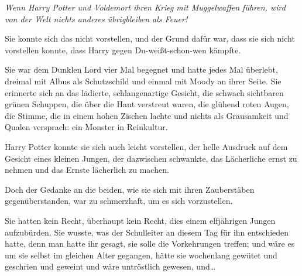 \emph{Wenn Harry Potter und Voldemort ihren Krieg mit Muggelwaffen führen, wird von der Welt nichts anderes übrigbleiben als Feuer!}

Sie konnte sich das nicht vorstellen, und der Grund dafür war, dass sie sich nicht vorstellen konnte, dass Harry gegen Du-weißt-schon-wen kämpfte.

Sie war dem Dunklen Lord vier Mal begegnet und hatte jedes Mal überlebt, dreimal mit Albus als Schutzschild und einmal mit Moody an ihrer Seite. Sie erinnerte sich an das lädierte, schlangenartige Gesicht, die schwach sichtbaren grünen Schuppen, die über die Haut verstreut waren, die glühend roten Augen, die Stimme, die in einem hohen Zischen lachte und nichts als Grausamkeit und Qualen versprach: ein Monster in Reinkultur.

Harry Potter konnte sie sich auch leicht vorstellen, der helle Ausdruck auf dem Gesicht eines kleinen Jungen, der dazwischen schwankte, das Lächerliche ernst zu nehmen und das Ernste lächerlich zu machen.

Doch der Gedanke an die beiden, wie sie sich mit ihren Zauberstäben gegenüberstanden, war zu schmerzhaft, um es sich vorzustellen.

Sie hatten kein Recht, überhaupt kein Recht, dies einem elfjährigen Jungen aufzubürden. Sie wusste, was der Schulleiter an diesem Tag für ihn entschieden hatte, denn man hatte ihr gesagt, sie solle die Vorkehrungen treffen; und wäre es um sie selbst im gleichen Alter gegangen, hätte sie wochenlang gewütet und geschrien und geweint und wäre untröstlich gewesen, und…

